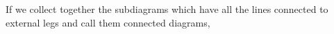 \documentclass[11pt, notitlepage]{report}
\renewcommand{\c}[1]{c_\mathbf{#1}}
\numberwithin{equation}{section}
\begin{document}


If we collect together the subdiagrams which have all the lines connected to external legs and call them connected diagrams,
\end{document}
